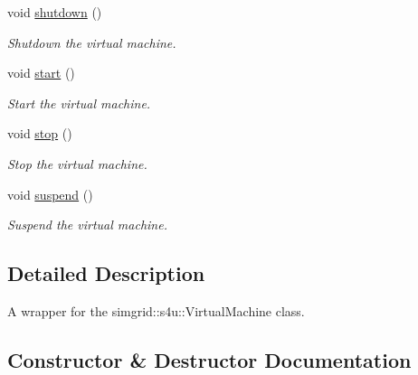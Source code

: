 \begin{DoxyCompactItemize}
\mbox{\label{classwrench_1_1_s4_u___virtual_machine_a9ac9124fbe6ad1ba3ed7d17bdd8d8e3a}} 
void \hyperlink{classwrench_1_1_s4_u___virtual_machine_a9ac9124fbe6ad1ba3ed7d17bdd8d8e3a}{shutdown} ()
\begin{DoxyCompactList}\small\item\em Shutdown the virtual machine. \end{DoxyCompactList}\item 
\mbox{\label{classwrench_1_1_s4_u___virtual_machine_a3e54f3687c452d85fcfd6938ca955eed}} 
void \hyperlink{classwrench_1_1_s4_u___virtual_machine_a3e54f3687c452d85fcfd6938ca955eed}{start} ()
\begin{DoxyCompactList}\small\item\em Start the virtual machine. \end{DoxyCompactList}\item 
\mbox{\label{classwrench_1_1_s4_u___virtual_machine_a5b4d7c796edba0c35cda2ad44ead3275}} 
void \hyperlink{classwrench_1_1_s4_u___virtual_machine_a5b4d7c796edba0c35cda2ad44ead3275}{stop} ()
\begin{DoxyCompactList}\small\item\em Stop the virtual machine. \end{DoxyCompactList}\item 
\mbox{\label{classwrench_1_1_s4_u___virtual_machine_a3f1845104d95c207bd5d69e7bf7e0490}} 
void \hyperlink{classwrench_1_1_s4_u___virtual_machine_a3f1845104d95c207bd5d69e7bf7e0490}{suspend} ()
\begin{DoxyCompactList}\small\item\em Suspend the virtual machine. \end{DoxyCompactList}\end{DoxyCompactItemize}


\subsection{Detailed Description}
A wrapper for the simgrid\+::s4u\+::\+Virtual\+Machine class. 

\subsection{Constructor \& Destructor Documentation}
\mbox{\label{classwrench_1_1_s4_u___virtual_machine_addac41abb2982e54857a85c0d12c4e31}} 
